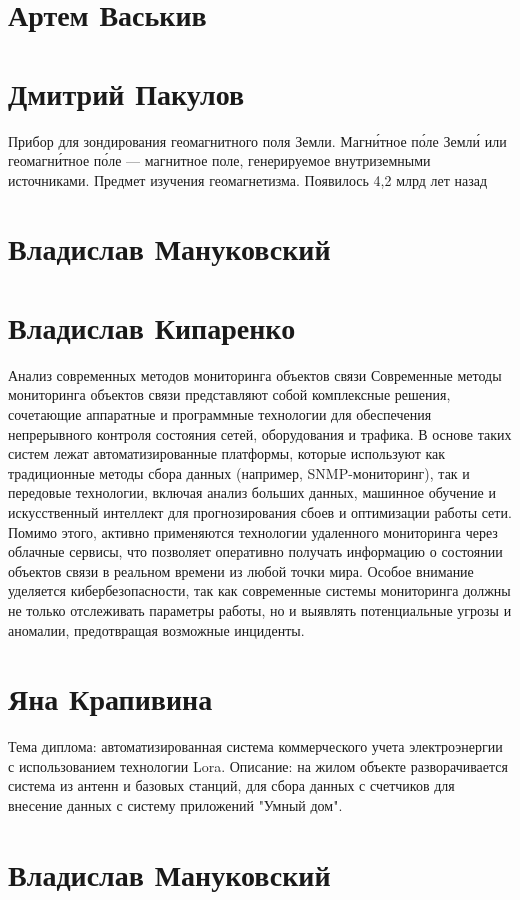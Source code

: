\documentclass{article}
\begin{document}
\section*{Артем Васькив}

\section*{Дмитрий Пакулов}
Прибор для зондирования геомагнитного поля Земли. Магни́тное по́ле Земли́ или геомагни́тное по́ле — магнитное поле, генерируемое внутриземными источниками. Предмет изучения геомагнетизма. Появилось 4,2 млрд лет назад

\section*{Владислав Мануковский}
\section*{Владислав Кипаренко}
Анализ современных методов мониторинга объектов связи
Современные методы мониторинга объектов связи представляют собой комплексные решения, сочетающие аппаратные и программные технологии для обеспечения непрерывного контроля состояния сетей, оборудования и трафика. В основе таких систем лежат автоматизированные платформы, которые используют как традиционные методы сбора данных (например, SNMP-мониторинг), так и передовые технологии, включая анализ больших данных, машинное обучение и искусственный интеллект для прогнозирования сбоев и оптимизации работы сети. Помимо этого, активно применяются технологии удаленного мониторинга через облачные сервисы, что позволяет оперативно получать информацию о состоянии объектов связи в реальном времени из любой точки мира. Особое внимание уделяется кибербезопасности, так как современные системы мониторинга должны не только отслеживать параметры работы, но и выявлять потенциальные угрозы и аномалии, предотвращая возможные инциденты.

\section*{Яна Крапивина}
Тема диплома: автоматизированная система коммерческого учета электроэнергии с использованием технологии Lora.
Описание: на жилом объекте разворачивается система из антенн и базовых станций, для сбора данных с счетчиков для внесение данных с систему приложений "Умный дом".
\section*{Владислав Мануковский}
\end{document}
